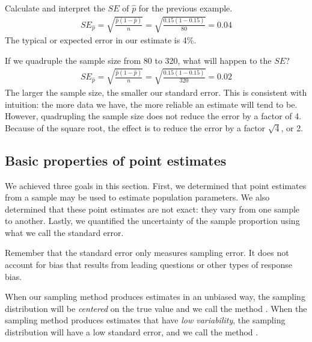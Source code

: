 \begin{examplewrap}
\begin{nexample}{Calculate and interpret the $SE$ of $\hat{p}$ for the previous example.}
\begin{align*}
SE_{\hat{p}}=\sqrt{\frac{\hat{p}(1-\hat{p})}{n}} =\sqrt{\frac{0.15(1-0.15)}{80}}=0.04
\end{align*}
The typical or expected error in our estimate is 4\%.
\end{nexample}
\end{examplewrap}

\begin{examplewrap}
\begin{nexample}{If we quadruple the sample size from 80 to 320, what will happen to the $SE$?}
\begin{align*}
SE_{\hat{p}}=\sqrt{\frac{\hat{p}(1-\hat{p})}{n}} =\sqrt{\frac{0.15(1-0.15)}{320}}=0.02
\end{align*}
The larger the sample size, the smaller our standard error. This is consistent with intuition: the more data we have, the more reliable an estimate will tend to be. However, quadrupling the sample size does not reduce the error by a factor of 4. Because of the square root, the effect is to reduce the error by a factor $\sqrt{4}$, or 2. 
\end{nexample}
\end{examplewrap}


\D{\newpage}

\subsection{Basic properties of point estimates}

We achieved three goals in this section. First, we determined that point estimates from a sample may be used to estimate population parameters. We also determined that these point estimates are not exact: they vary from one sample to another. Lastly, we quantified the uncertainty of the sample proportion using what we  call the standard error. 

Remember that the standard error only measures sampling error.  It does not account for bias that results from leading questions or other types of response bias.

When our sampling method produces estimates in an unbiased way, the sampling distribution will be \emph{centered} on the true value and we call the method .  When the sampling method  produces estimates that have \emph{low variability}, the sampling distribution will have a low standard error, and we call the method .


